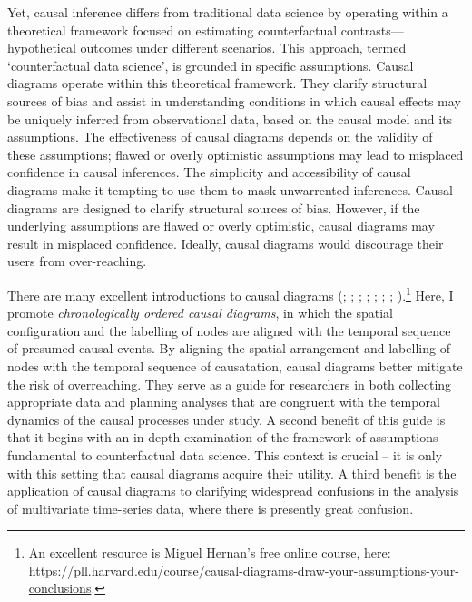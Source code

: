 \documentclass[
  singlecolumn,
  9pt]{article}
\begin{document}
Yet, causal inference differs from traditional data science by operating
within a theoretical framework focused on estimating counterfactual
contrasts---hypothetical outcomes under different scenarios. This
approach, termed `counterfactual data science', is grounded in specific
assumptions. Causal diagrams operate within this theoretical framework.
They clarify structural sources of bias and assist in understanding
conditions in which causal effects may be uniquely inferred from
observational data, based on the causal model and its assumptions. The
effectiveness of causal diagrams depends on the validity of these
assumptions; flawed or overly optimistic assumptions may lead to
misplaced confidence in causal inferences. The simplicity and
accessibility of causal diagrams make it tempting to use them to mask
unwarrented inferences. Causal diagrams are designed to clarify
structural sources of bias. However, if the underlying assumptions are
flawed or overly optimistic, causal diagrams may result in misplaced
confidence. Ideally, causal diagrams would discourage their users from
over-reaching.

There are many excellent introductions to causal diagrams
(;
;
;
;
;
; ; ).\footnote{An
  excellent resource is Miguel Hernan's free online course, here:
  \url{https://pll.harvard.edu/course/causal-diagrams-draw-your-assumptions-your-conclusions}.}
Here, I promote \emph{chronologically ordered causal diagrams}, in which
the spatial configuration and the labelling of nodes are aligned with
the temporal sequence of presumed causal events. By aligning the spatial
arrangement and labelling of nodes with the temporal sequence of
causatation, causal diagrams better mitigate the risk of overreaching.
They serve as a guide for researchers in both collecting appropriate
data and planning analyses that are congruent with the temporal dynamics
of the causal processes under study. A second benefit of this guide is
that it begins with an in-depth examination of the framework of
assumptions fundamental to counterfactual data science. This context is
crucial -- it is only with this setting that causal diagrams acquire
their utility. A third benefit is the application of causal diagrams to
clarifying widespread confusions in the analysis of multivariate
time-series data, where there is presently great confusion.
\end{document}

